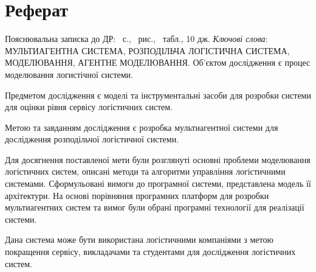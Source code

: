 \section*{Реферат}
Пояснювальна записка до ДР: \pageref{LastPage}~с., \totalfigures~рис., \totaltables~табл., 10 дж. \bigbreak
\textit{Ключові слова}: \MakeUppercase{мультиагентна система, розподільча логістична система, моделювання, агентне моделювання}. \bigbreak
Об'єктом дослідження є процес моделювання логистічної системи. 

Предметом дослідження є моделі та інструментальні засоби для розробки системи для оцінки рівня сервісу логістичних систем.

Метою та завданням дослідження є розробка мультиагентної системи для дослідження розподільчої логістичної системи.

Для досягнення поставленої мети були розглянуті основні проблеми моделювання логістичних систем, описані методи та алгоритми управління логістичними системами. Сформульовані вимоги до програмної системи, представлена модель її архітектури. На основі порівняння програмних платформ для розробки мультиагентних систем та вимог були обрані програмні технології для реалізації системи.

Дана система може бути використана логістичними компаніями з метою покращення сервісу, викладачами та студентами для дослідження логістичних систем.
